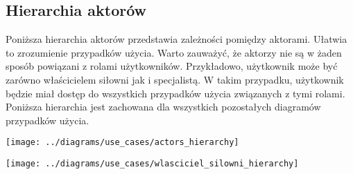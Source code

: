 \subsection{Hierarchia aktorów}\label{subsec:hierarchia-aktorow}

{Poniższa hierarchia aktorów przedstawia zależności pomiędzy aktorami.
Ułatwia to zrozumienie przypadków użycia. Warto zauważyć, że aktorzy
nie są w żaden sposób powiązani z rolami użytkowników.
Przykładowo, użytkownik może być zarówno właścicielem siłowni jak i
specjalistą. W takim przypadku, użytkownik będzie miał dostęp do
wszystkich przypadków użycia związanych z tymi rolami. Poniższa hierarchia
jest zachowana dla wszystkich pozostałych diagramów przypadków użycia.}

{\texttt{[image: ../diagrams/use\_cases/actors\_hierarchy]}}

{\texttt{[image: ../diagrams/use\_cases/wlasciciel\_silowni\_hierarchy]}}